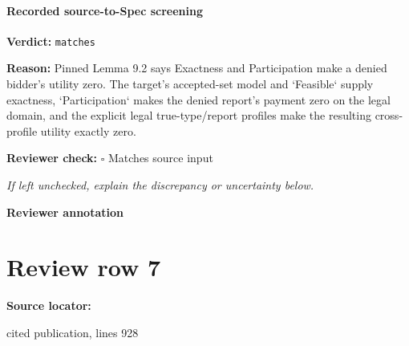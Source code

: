 \documentclass[10pt]{article}
\newcommand{\reviewerbox}{%
  \par\noindent\fbox{\parbox{0.96\linewidth}{\rule{0pt}{0.38in}}}\par
}
\newcommand{\reviewmatch}[1]{%
  \par\noindent\textbf{Reviewer check:} $\square$\; #1\par
  \noindent\emph{If left unchecked, explain the discrepancy or uncertainty below.}\par
}
\begin{document}
\paragraph{Recorded source-to-Spec screening}
\textbf{Verdict:} \texttt{matches}
\\
{\raggedright
\textbf{Reason:} Pinned Lemma 9.\allowbreak{}2 says Exactness and Participation make a denied bidder's utility zero.\allowbreak{} The target's accepted-\allowbreak{}set model and `Feasible` supply exactness, `Participation` makes the denied report's payment zero on the legal domain, and the explicit legal true-\allowbreak{}type/\allowbreak{}report profiles make the resulting cross-\allowbreak{}profile utility exactly zero.\allowbreak{}
\par}
\reviewmatch{Matches source input}
\noindent\textbf{Reviewer annotation}\par
\reviewerbox
\clearpage
\hypertarget{source-claim-f8f8ff7b65d62084}{}
\section*{Review row 7}
\textbf{Source locator:} {\footnotesize\raggedright cited publication, lines 928\par}
\end{document}
